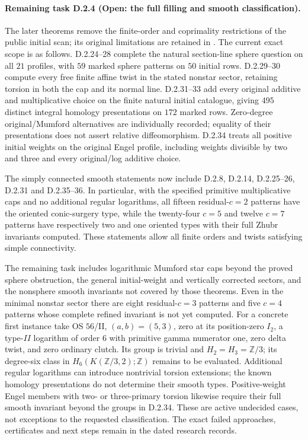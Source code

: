 \paragraph{Remaining task D.2.4 (Open: the full filling and smooth classification).}
The later theorems remove the finite-order and coprimality restrictions
of the public initial scan; its original limitations are retained in
. The current exact scope is as follows.
D.2.24--28 complete the natural section-line sphere question on all
$21$ profiles, with $59$ marked sphere patterns on $50$ initial rows.
D.2.29--30 compute every free finite affine twist in the stated
nonstar sector, retaining torsion in both the cap and its normal line.
D.2.31--33 add every original additive and multiplicative choice
on the finite natural initial catalogue, giving $495$ distinct
integral homology presentations on $172$ marked rows. Zero-degree
original/Mumford alternatives are individually recorded; equality
of their presentations does not assert relative diffeomorphism.
D.2.34 treats all positive initial weights on the original Engel
profile, including weights divisible by two and three and every
original/log additive choice.

The simply connected smooth statements now include D.2.8,
D.2.14, D.2.25--26, D.2.31 and D.2.35--36. In particular,
with the specified primitive multiplicative caps and no additional
regular logarithms, all fifteen residual-$c=2$ patterns have the
oriented conic-surgery type, while the twenty-four $c=5$ and twelve
$c=7$ patterns have respectively two and one oriented types with
their full Zhubr invariants computed. These statements allow all
finite orders and twists satisfying simple connectivity.

The remaining task includes logarithmic Mumford star caps beyond
the proved sphere obstruction, the general initial-weight and
vertically corrected sectors, and the nonsphere smooth invariants
not covered by those theorems. Even in the minimal nonstar sector
there are eight residual-$c=3$ patterns and five $c=4$ patterns
whose complete refined invariant is not yet computed.
For a concrete first instance take OS $56$/II, $(a,b)=(5,3)$,
zero at its position-zero $I_2$, a type-$II$ logarithm of order
$6$ with primitive gamma numerator one, zero delta twist, and
zero ordinary clutch. Its group is trivial and
$H_2=H_3=\mathbb Z/3$; its degree-six class in
$H_6(K(\mathbb Z/3,2);\mathbb Z)$ remains to be evaluated.
Additional
regular logarithms can introduce nontrivial torsion extensions;
the known homology presentations do not determine their smooth
types. Positive-weight Engel members with two- or three-primary
torsion likewise require their full smooth invariant beyond the
groups in D.2.34. These are active undecided cases, not exceptions
to the requested classification. The exact failed approaches,
certificates and next steps remain in the dated research records.

